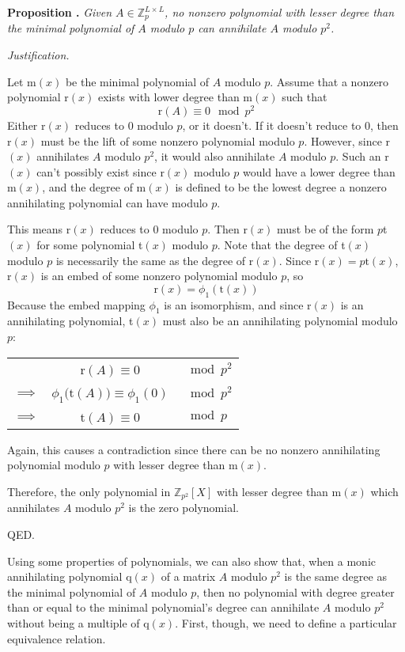 \documentclass[a4paper, 12pt, reqno]{amsart}
\newcounter{propcounter}
\newenvironment{proposition}[1]
{
	\vspace{1em}
	\refstepcounter{propcounter} %
	\textbf{Proposition \thepropcounter.} \emph{#1}
	
	\emph{Justification.}
}
{
	QED. \\
}
\begin{document}
		\begin{proposition}{Given $A \in \mathds{Z}_{p}^{L \times L}$, no nonzero polynomial with lesser degree than the minimal polynomial of $A$ modulo $p$ can annihilate 
		$A$ modulo $p^2$.}
			\label{prop:noLowerZeros}
			Let m$(x)$ be the minimal polynomial of $A$ modulo $p$. Assume that a nonzero polynomial r$(x)$ exists with lower degree than m$(x)$ such that
			\[
				\text{r}(A) \equiv 0 \mod{p^2}
			\]
			Either r$(x)$ reduces to 0 modulo $p$, or it doesn't. If it doesn't reduce to 0, then r$(x)$ must be the lift of some nonzero polynomial modulo $p$. However,
			since r$(x)$ annihilates $A$ modulo $p^2$, it would also annihilate $A$ modulo $p$. Such an r$(x)$ can't possibly exist since r$(x)$ modulo $p$ would have a 
			lower degree than m$(x)$, and the degree of m$(x)$ is defined to be the lowest degree a nonzero annihilating polynomial can have modulo $p$.
			
			This means r$(x)$ reduces to 0 modulo $p$. Then r$(x)$ must be of the form $p$t$(x)$ for some polynomial t$(x)$ modulo $p$. Note that the degree of t$(x)$ 
			modulo $p$ is necessarily the same as the degree of r$(x)$. Since r$(x) = p\text{t}(x)$, r$(x)$ is an embed of some nonzero polynomial modulo $p$, so
			\[
				\text{r}(x) = \phi_1(\text{t}(x))
			\]
			Because the embed mapping $\phi_1$ is an isomorphism, and since r$(x)$ is an annihilating polynomial, t$(x)$ must also be an annihilating polynomial modulo $p$:
			\begin{center}
				\begin{tabular}{lcl}
					           & r$(A) \equiv 0$                   & $\mod{p^2}$ \\
					$\implies$ & $\phi_1($t$(A)) \equiv \phi_1(0)$ & $\mod{p^2}$ \\
					$\implies$ & t$(A) \equiv 0$                   & $\mod{p}$
				\end{tabular}
			\end{center}
			Again, this causes a contradiction since there can be no nonzero annihilating polynomial modulo $p$ with lesser degree than m$(x)$.
			
			Therefore, the only polynomial in $\mathds{Z}_{p^2}[X]$ with lesser degree than m$(x)$ which annihilates $A$ modulo $p^2$ is the zero polynomial.
		\end{proposition}
		
		Using some properties of polynomials, we can also show that, when a monic annihilating polynomial q$(x)$ of a matrix $A$ modulo $p^2$ is the same degree as the 
		minimal polynomial of $A$ modulo $p$, then no polynomial with degree greater than or equal to the minimal polynomial's degree can annihilate $A$ modulo $p^2$ 
		without being a multiple of q$(x)$. First, though, we need to define a particular equivalence relation.
		
\end{document}
